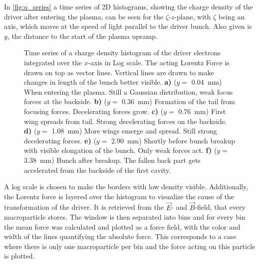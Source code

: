 \documentclass[bachelor_thesis]{subfiles}
\begin{document}
In \autoref{fig:q_series} a time series of 2D histograms, showing the charge density of the driver after entering the plasma, can be seen for the $\zeta$-$z$-plane, with $\zeta$ being an axis, which moves at the speed of light parallel to the driver bunch. Also given is $y$, the distance to the start of the plasma upramp.
\begin{figure}
	\centering
	
	\caption{Time series of a charge density histogram of the driver electrons integrated over the $x$-axis in Log scale. The acting Lorentz Force is drawn on top as vector lines. Vertical lines are drawn to make changes in length of the bunch better visible. 
	\textbf{a)} ($y=$ \qty{0.04}{mm}) When entering the plasma. Still a Gaussian distribution, weak focus forces at the backside.
	\textbf{b)} ($y=$ \qty{0.36}{mm}) Formation of the tail from focusing forces. Decelerating forces grow.
	\textbf{c)} ($y=$ \qty{0.76}{mm}) First wing spreads from tail. Strong decelerating forces on the backside.
	\textbf{d)} ($y=$ \qty{1.08}{mm}) More wings emerge and spread. Still strong decelerating forces.
	\textbf{e)} ($y=$ \qty{2.90}{mm}) Shortly before bunch breakup with visible elongation of the bunch. Only weak forces act.
	\textbf{f)} ($y=$ \qty{3.38}{mm}) Bunch after breakup. The fallen back part gets accelerated from the backside of the first cavity.}
	\label{fig:q_series}
\end{figure}
A log scale is chosen to make the borders with low density visible. Additionally, the Lorentz force is layered over the histogram to visualize the cause of the transformation of the driver. It is retrieved from the $\vec{E}$- and $\vec{B}$-field, that every macroparticle stores.
The window is then separated into bins and for every bin the mean force was calculated and plotted as a force field, with the color and width of the lines quantifying the absolute force. 
This corresponds to a case where there is only one macroparticle per bin and the force acting on this particle is plotted.
\end{document}
